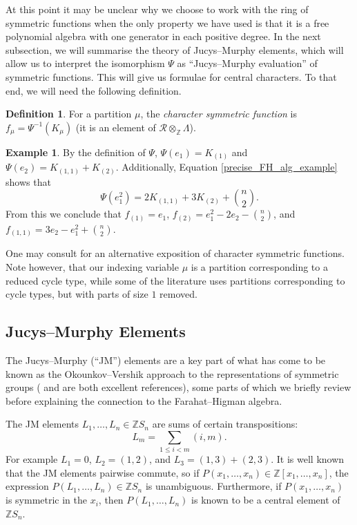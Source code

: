 \documentclass[10pt]{article}
\theoremstyle{definition}
\newtheorem{definition}[theorem]{Definition}
\newtheorem{example}[theorem]{Example}
\begin{document}
At this point it may be unclear why we choose to work with the ring of symmetric functions when the only property we have used is that it is a free polynomial algebra with one generator in each positive degree. In the next subsection, we will summarise the theory of Jucys--Murphy elements, which will allow us to interpret the isomorphism $\Psi$ as ``Jucys--Murphy evaluation'' of symmetric functions. This will give us formulae for central characters. To that end, we will need the following definition.
\begin{definition} \label{char_sym_fun_def}
For a partition $\mu$, the \emph{character symmetric function} is $f_\mu = \Psi^{-1}(K_\mu)$ \textup{(}it is an element of $\mathcal{R} \otimes_{\mathbb{Z}} \Lambda$\textup{)}.
\end{definition}
\begin{example} \label{char_sym_fn_example}
By the definition of $\Psi$, $\Psi(e_1) = K_{(1)}$ and $\Psi(e_2) = K_{(1,1)} + K_{(2)}$. Additionally, Equation \eqref{precise_FH_alg_example} shows that 
\[
\Psi(e_1^2) = 2 K_{(1,1)} + 3K_{(2)} + \binom{n}{2}.
\]
From this we conclude that $f_{(1)} = e_1$, $f_{(2)} = e_1^2 - 2e_2 - \binom{n}{2}$, and $f_{(1,1)} = 3e_2 - e_1^2 + \binom{n}{2}$.
\end{example}


One may consult  \cite[Section 5.4]{CST} for an alternative exposition of character symmetric functions. Note however, that our indexing variable $\mu$ is a partition corresponding to a reduced cycle type, while some of the literature uses partitions corresponding to cycle types, but with parts of size $1$ removed.

\subsection{Jucys--Murphy Elements} The Jucys--Murphy (``JM'') elements are a key part of what has come to be known as the Okounkov--Vershik approach to the representations of symmetric groups (\cite{OkounkovVershik} and \cite{Kleshchev} are both excellent references), some parts of which we briefly review before explaining the connection to the Farahat--Higman algebra.

The JM elements $L_1, \ldots, L_n \in \mathbb{Z}S_n$ are sums of certain transpositions:
\[
L_m = \sum_{1\leq i < m} (i,m).
\]
For example $L_1 = 0$, $L_2 = (1,2)$, and $L_3 = (1,3)+(2,3)$. It is well known that the JM elements pairwise commute, so if $P(x_1, \ldots, x_n) \in \mathbb{Z}[x_1, \ldots, x_n]$, the expression $P(L_1, \ldots, L_n) \in \mathbb{Z}S_n$ is unambiguous. Furthermore, if $P(x_1, \ldots, x_n)$ is symmetric in the $x_i$, then $P(L_1, \ldots, L_n)$ is known to be a central element of $\mathbb{Z}S_n$.
\end{document}
